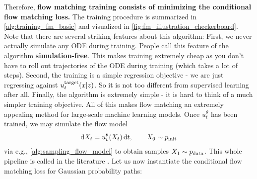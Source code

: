 Therefore, \textbf{flow matching training consists of minimizing the conditional flow matching loss.} The training procedure is summarized in \cref{alg:training_fm_basic} and visualized in \cref{fig:fm_illustration_checkerboard}. Note that there are several striking features about this algorithm: First, we never actually simulate any ODE during training. People call this feature of the algorithm \textbf{simulation-free}. This makes training extremely cheap as you don't have to roll out trajectories of the ODE during training (which takes a lot of steps). Second, the training is a simple regression objective - we are just regressing against $u^{\text{target}}_t(x|z)$. So it is not too different from supervised learning after all. Finally, the algorithm is extremely simple - it is hard to think of a much simpler training objective. All of this makes flow matching an extremely appealing method for large-scale machine learning models. Once $u_t^{\theta}$ has been trained, we may simulate the flow model
\begin{align}
    \mathrm{d} X_t = u_t^\theta(X_t)\, \mathrm{d} t,\quad\quad X_0\sim p_{\rm{init}}
\end{align}
via e.g., \cref{alg:sampling_flow_model} to obtain samples $X_1\sim p_{\rm{data}}$. This whole pipeline is called  in the literature \citep{lipman2022flow, liu2022flow, albergo2023stochastic, lipman2024flow}.
Let us now instantiate the conditional flow matching loss for Gaussian probability paths:
